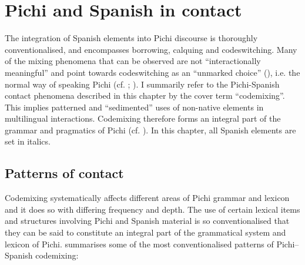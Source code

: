 \chapter{Pichi and Spanish in contact}

The integration of Spanish elements into Pichi discourse is thoroughly conventionalised, and encompasses borrowing, calquing and codeswitching. Many of the mixing phenomena that can be observed are not “interactionally meaningful” \citep[20]{Auer1998} and point towards codeswitching as an “unmarked choice” (\citealt{Scotton1993}), i.e. the normal way of speaking Pichi (cf. \citealt{Yakpo2015}; \citealt{Yakpo2017b}). I summarily refer to the Pichi-Spanish contact phenomena described in this chapter by the cover term “codemixing”\citep{Muysken2000}. This implies patterned and “sedimented” \citep{Auer1999} uses of non-native elements in multilingual interactions. Codemixing therefore forms an integral part of the grammar and pragmatics of Pichi (cf. \citealt{Yakpo2009complexity,Yakpo2018}). In this chapter, all Spanish elements are set in italics. 

\section{Patterns of contact}\label{sec:13.1}

Codemixing systematically affects different areas of Pichi grammar and lexicon and it does so with differing frequency and depth. The use of certain lexical items and structures involving Pichi and Spanish material is so conventionalised that they can be said to constitute an integral part of the grammatical system and lexicon of Pichi.  summarises some of the most conventionalised patterns of Pichi–Spanish codemixing: 

